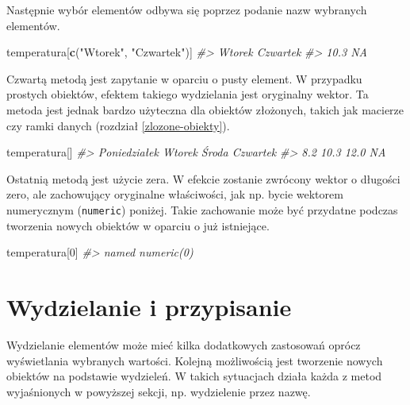 \documentclass[paper=6in:9in,pagesize=pdftex,headinclude=on,footinclude=on,10pt]{scrbook}
\newenvironment{Shaded}{\begin{snugshade}}{\end{snugshade}}
\newcommand{\CommentTok}[1]{\textcolor[rgb]{0.56,0.35,0.01}{\textit{#1}}}
\newcommand{\DecValTok}[1]{\textcolor[rgb]{0.00,0.00,0.81}{#1}}
\newcommand{\KeywordTok}[1]{\textcolor[rgb]{0.13,0.29,0.53}{\textbf{#1}}}
\newcommand{\NormalTok}[1]{#1}
\newcommand{\StringTok}[1]{\textcolor[rgb]{0.31,0.60,0.02}{#1}}
\begin{document}
Następnie wybór elementów odbywa się poprzez podanie nazw wybranych elementów.

\begin{Shaded}
\begin{Highlighting}[]
\NormalTok{temperatura[}\KeywordTok{c}\NormalTok{(}\StringTok{"Wtorek"}\NormalTok{, }\StringTok{"Czwartek"}\NormalTok{)]}
\CommentTok{#>   Wtorek Czwartek }
\CommentTok{#>     10.3       NA}
\end{Highlighting}
\end{Shaded}

Czwartą metodą jest zapytanie w oparciu o pusty element.
W przypadku prostych obiektów, efektem takiego wydzielania jest oryginalny wektor.
Ta metoda jest jednak bardzo użyteczna dla obiektów złożonych, takich jak macierze czy ramki danych (rozdział \ref{zlozone-obiekty}).

\begin{Shaded}
\begin{Highlighting}[]
\NormalTok{temperatura[]}
\CommentTok{#> Poniedziałek       Wtorek        Środa     Czwartek }
\CommentTok{#>          8.2         10.3         12.0           NA}
\end{Highlighting}
\end{Shaded}

Ostatnią metodą jest użycie zera.
W efekcie zostanie zwrócony wektor o długości zero, ale zachowujący oryginalne właściwości, jak np. bycie wektorem numerycznym (\texttt{numeric}) poniżej.
Takie zachowanie może być przydatne podczas tworzenia nowych obiektów w oparciu o już istniejące.

\begin{Shaded}
\begin{Highlighting}[]
\NormalTok{temperatura[}\DecValTok{0}\NormalTok{]}
\CommentTok{#> named numeric(0)}
\end{Highlighting}
\end{Shaded}

\hypertarget{wip-vector}{%
\section{Wydzielanie i przypisanie}\label{wip-vector}}

Wydzielanie elementów może mieć kilka dodatkowych zastosowań oprócz wyświetlania wybranych wartości.
Kolejną możliwością jest tworzenie nowych obiektów na podstawie wydzieleń.
W takich sytuacjach działa każda z metod wyjaśnionych w powyższej sekcji, np. wydzielenie przez nazwę.
\end{document}
